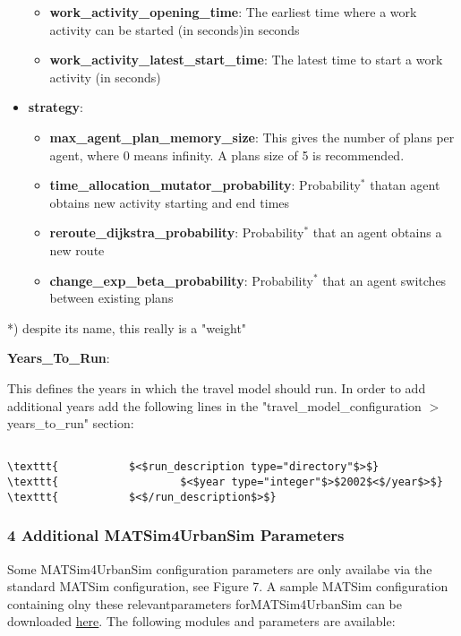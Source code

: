 \documentclass[a4paper,11pt]{report}
\begin{document}
\begin{itemize}
\begin{itemize}
	\item \textbf{work\_activity\_opening\_time}: The earliest time where a work activity can be started (in seconds)in seconds
	\item \textbf{work\_activity\_latest\_start\_time}: The latest time to start a work activity (in seconds)
\end{itemize}
	\item \textbf{strategy}:   
\begin{itemize}
	\item \textbf{max\_agent\_plan\_memory\_size}: This gives the number of plans per agent, where 0 means infinity. A plans size of 5 is recommended.
	\item \textbf{time\_allocation\_mutator\_probability}: Probability$^*$ thatan agent obtains new activity starting and end times
	\item \textbf{reroute\_dijkstra\_probability}: Probability$^*$ that an agent obtains a new route
	\item \textbf{change\_exp\_beta}\textbf{\_probability}: Probability$^*$ that an agent switches between existing plans
\end{itemize}
\end{itemize}

*) despite its name, this really is a "weight"

\textbf{Years\_To\_Run}:

This defines the years in which the travel model should run. In order  to add additional years add the following lines in the  "travel\_model\_configuration $>$ years\_to\_run" section:
\begin{verbatim}

\texttt{           $<$run_description type="directory"$>$}
\texttt{                   $<$year type="integer"$>$2002$<$/year$>$}
\texttt{           $<$/run_description$>$}
\end{verbatim}

\subsubsection{4 Additional MATSim4UrbanSim Parameters}

Some MATSim4UrbanSim configuration parameters are only availabe via the standard MATSim configuration, see Figure 7. A sample MATSim configuration containing olny these relevantparameters forMATSim4UrbanSim can be downloaded \href{https://svn.vsp.tu-berlin.de/repos/public-svn/matsim/examples/countries/us/seattle/external_matsim_config_with_matsim4urbansim_settings.xml}{here}. The following modules and parameters are available:
\end{document}
